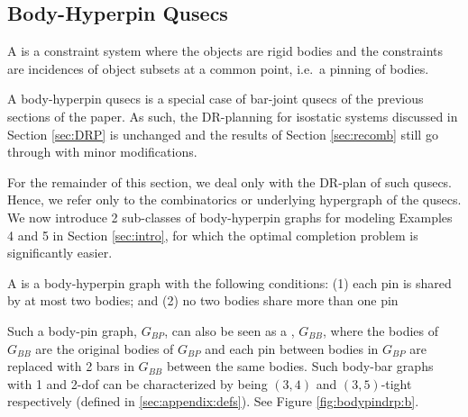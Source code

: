 \subsection{Body-Hyperpin Qusecs}



\begin{definition}
    A  is a constraint system where the objects are rigid bodies and the constraints are incidences of object subsets at a common point, i.e.\ a pinning of bodies.
\end{definition}

\begin{remark*}
\label{rem:bodypin_is_barjoint}
    A body-hyperpin qusecs is a special case of bar-joint qusecs of the previous sections of the paper. As such, the DR-planning for isostatic systems discussed in Section \ref{sec:DRP} is unchanged and the results of Section \ref{sec:recomb} still go through with minor modifications.
\end{remark*}

For the remainder of this section, we deal only with the DR-plan of such qusecs. Hence, we refer only to the combinatorics or underlying hypergraph of the qusecs. We now introduce 2 sub-classes of body-hyperpin graphs for modeling Examples 4 and 5 in Section \ref{sec:intro}, for which the optimal completion problem is significantly easier.

\begin{definition}
\label{def:body-pin}
    A  is a body-hyperpin graph with the following conditions:
    (1) each pin is shared by at most two bodies; and
    (2) no two bodies share more than one pin

    Such a body-pin graph, $G_{BP}$, can also be seen as a , $G_{BB}$, where the bodies of $G_{BB}$ are the original bodies of $G_{BP}$ and each pin between bodies in $G_{BP}$ are replaced with 2 bars in $G_{BB}$ between the same bodies.
    Such body-bar graphs with 1 and 2-dof can be characterized by being $(3,4)$ and $(3,5)$-tight respectively \cite{Lee:2007:PGA} \cite{streinu2009sparse} (defined in \ref{sec:appendix:defs}). See Figure \ref{fig:bodypindrp:b}.
\end{definition}

